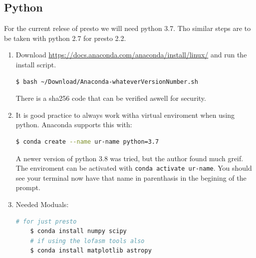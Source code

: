 \documentclass{article}
\begin{document}
\subsection{Python}
For the current relese of presto we will need python 3.7. Tho similar steps are to be taken with python 2.7 for presto 2.2. 
\begin{enumerate}
    \item Download \href{Anaconda 3}{https://docs.anaconda.com/anaconda/install/linux/} and run the install script. \begin{lstlisting}[language=bash]
$ bash ~/Download/Anaconda-whateverVersionNumber.sh
\end{lstlisting}
There is a sha256 code that can be verified aswell for security. 
    \item It is good practice to always work witha virtual enviroment when using python. Anaconda supports this with: \begin{lstlisting}[language=bash] 
$ conda create --name ur-name python=3.7
\end{lstlisting} 
A newer version of python 3.8 was tried, but the author found much greif.
The enviroment can be activated with \texttt{conda activate ur-name}. You should see your terminal now have that name in parenthasis in the begining of the prompt.
    \item Needed Moduals: \begin{lstlisting}[language=bash]
    # for just presto
    $ conda install numpy scipy
    # if using the lofasm tools also
    $ conda install matplotlib astropy
    \end{lstlisting}
\end{enumerate}
\end{document}
